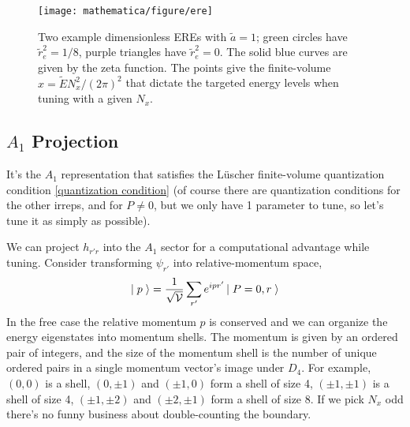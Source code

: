 \begin{figure}
	\texttt{[image: mathematica/figure/ere]}
	\caption{
		Two example dimensionless EREs with $\tilde{a}=1$; green circles have $\tilde{r}_e^2=1/8$, purple triangles have $\tilde{r}_e^2=0$.
		The solid blue curves are given by the zeta function.
		The points give the finite-volume $x = \tilde{E} N_x^2 / (2\pi)^2$ that dictate the targeted energy levels when tuning with a given $N_x$.
	}
	\label{fig:ere tuning}
\end{figure}

\subsection{$A_1$ Projection}

It's the $A_1$ representation that satisfies the L\"{u}scher finite-volume quantization condition \eqref{quantization condition} (of course there are quantization conditions for the other irreps, and for $P\neq 0$, but we only have 1 parameter to tune, so let's tune it as simply as possible).

We can project $h_{r'r}$ into the $A_1$ sector for a computational advantage while tuning.
Consider transforming $\psi_{r'}$ into relative-momentum space,
\begin{align}
    \left|\;p\;\right\rangle = \frac{1}{\sqrt{\mathcal{V}}}\sum_{r'} e^{ipr'} \left|\;P=0, r\;\right\rangle
\end{align}
In the free case the relative momentum $p$ is conserved and we can organize the energy eigenstates into momentum shells.
The momentum is given by an ordered pair of integers, and the size of the momentum shell is the number of unique ordered pairs in a single momentum vector's image under $D_4$.
For example, $(0,0)$ is a shell, $(0,\pm 1)$ and $(\pm 1, 0)$ form a shell of size 4, $(\pm 1, \pm 1)$ is a shell of size 4, $(\pm 1, \pm 2)$ and $(\pm 2, \pm 1)$ form a shell of size 8.
If we pick $N_x$ odd there's no funny business about double-counting the boundary.

